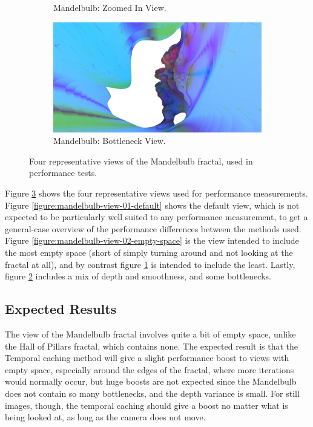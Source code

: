 \begin{figure}[ht]
\begin{subfigure}[c]{0.45\linewidth}
		\caption{Mandelbulb: Zoomed In View.}
		\label{figure:mandelbulb-view-03-no-space}
	\end{subfigure}
	\hfill
	\begin{subfigure}[c]{0.45\linewidth}
		\includegraphics[width=\linewidth, frame]{Images/Results/Mandelbulb-View-04-Bottleneck}
		\caption{Mandelbulb: Bottleneck View.}
		\label{figure:mandelbulb-view-04-bottleneck}
	\end{subfigure}

	\caption{Four representative views of the Mandelbulb fractal, used in performance tests.}
	\label{figure:mandelbulb-views}
\end{figure}

Figure \ref{figure:mandelbulb-views} shows the four representative views used for performance measurements. Figure \ref{figure:mandelbulb-view-01-default} shows the default view, which is not expected to be particularly well suited to any performance measurement, to get a general-case overview of the performance differences between the methods used. Figure \ref{figure:mandelbulb-view-02-empty-space} is the view intended to include the most empty space (short of simply turning around and not looking at the fractal at all), and by contrast figure \ref{figure:mandelbulb-view-03-no-space} is intended to include the least. Lastly, figure \ref{figure:mandelbulb-view-04-bottleneck} includes a mix of depth and smoothness, and some bottlenecks.

\subsection{Expected Results}

The view of the Mandelbulb fractal involves quite a bit of empty space, unlike the Hall of Pillars fractal, which contains none. The expected result is that the Temporal caching method will give a slight performance boost to views with empty space, especially around the edges of the fractal, where more iterations would normally occur, but huge boosts are not expected since the Mandelbulb does not contain so many bottlenecks, and the depth variance is small. For still images, though, the temporal caching should give a boost no matter what is being looked at, as long as the camera does not move.\newline

